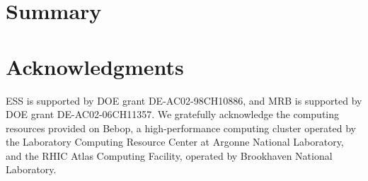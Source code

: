 \documentclass[twocolappendix, appendixfloats, numberedappendix, twocolumn, apj]{openjournal}
\begin{document}
\section{Summary}\label{sec:conc}


\section*{Acknowledgments}

ESS is supported by DOE grant DE-AC02-98CH10886, and MRB is supported by DOE
grant DE-AC02-06CH11357.  We gratefully acknowledge the computing resources
provided on Bebop, a high-performance computing cluster operated by the
Laboratory Computing Resource Center at Argonne National Laboratory, and the
RHIC Atlas Computing Facility, operated by Brookhaven National Laboratory.




\end{document}
